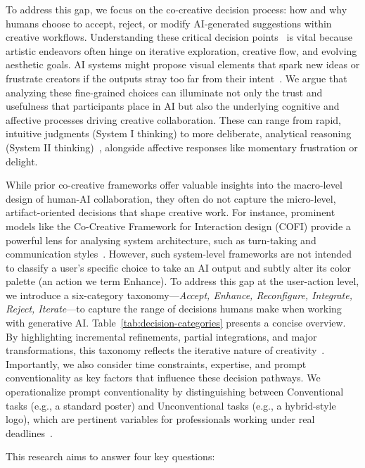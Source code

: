 \documentclass[letterpaper]{article} %
\begin{document}
To address this gap, we focus on the co-creative decision process: how and why humans choose to accept, reject, or modify AI-generated suggestions within creative workflows. Understanding these critical decision points~\cite{cao2022understanding} is vital because artistic endeavors often hinge on iterative exploration, creative flow, and evolving aesthetic goals. AI systems might propose visual elements that spark new ideas or frustrate creators if the outputs stray too far from their intent~\cite{saetra2024machine}. We argue that analyzing these fine-grained choices can illuminate not only the trust and usefulness that participants place in AI but also the underlying cognitive and affective processes driving creative collaboration. These can range from rapid, intuitive judgments (System I thinking) to more deliberate, analytical reasoning (System II thinking)~\cite{kahneman2011fast}, alongside affective responses like momentary frustration or delight.

While prior co-creative frameworks offer valuable insights into the macro-level design of human-AI collaboration, they often do not capture the micro-level, artifact-oriented decisions that shape creative work. For instance, prominent models like the Co-Creative Framework for Interaction design (COFI) provide a powerful lens for analysing system architecture, such as turn-taking and communication styles~\cite{rezwana2023designing}. However, such system-level frameworks are not intended to classify a user's specific choice to take an AI output and subtly alter its color palette (an action we term Enhance). To address this gap at the user-action level, we introduce a six-category taxonomy—\textit{Accept, Enhance, Reconfigure, Integrate, Reject, Iterate}—to capture the range of decisions humans make when working with generative AI. Table~\ref{tab:decision-categories} presents a concise overview. By highlighting incremental refinements, partial integrations, and major transformations, this taxonomy reflects the iterative nature of creativity~\cite{sawyer2006educating}. Importantly, we also consider time constraints, expertise, and prompt conventionality as key factors that influence these decision pathways. We operationalize prompt conventionality by distinguishing between Conventional tasks (e.g., a standard poster) and Unconventional tasks (e.g., a hybrid-style logo), which are pertinent variables for professionals working under real deadlines~\cite{hong2019artificial,tillmann2024artificial}. 
 
This research aims to answer four key questions:
\end{document}
